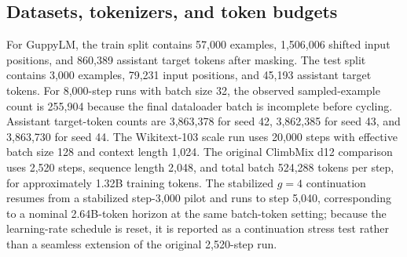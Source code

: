 \documentclass{article}
\begin{document}
\subsection{Datasets, tokenizers, and token budgets}

\begin{table}[htbp]
\centering
\caption{Dataset and tokenizer provenance.}
\label{tab:data}
\end{table}

For GuppyLM, the train split contains 57,000 examples, 1,506,006 shifted input positions, and 860,389 assistant target tokens after masking. The test split contains 3,000 examples, 79,231 input positions, and 45,193 assistant target tokens. For 8,000-step runs with batch size 32, the observed sampled-example count is 255,904 because the final dataloader batch is incomplete before cycling. Assistant target-token counts are 3,863,378 for seed 42, 3,862,385 for seed 43, and 3,863,730 for seed 44. The Wikitext-103 scale run uses 20,000 steps with effective batch size 128 and context length 1,024. The original ClimbMix d12 comparison uses 2,520 steps, sequence length 2,048, and total batch 524,288 tokens per step, for approximately 1.32B training tokens. The stabilized \(g=4\) continuation resumes from a stabilized step-3,000 pilot and runs to step 5,040, corresponding to a nominal 2.64B-token horizon at the same batch-token setting; because the learning-rate schedule is reset, it is reported as a continuation stress test rather than a seamless extension of the original 2,520-step run.
\end{document}

